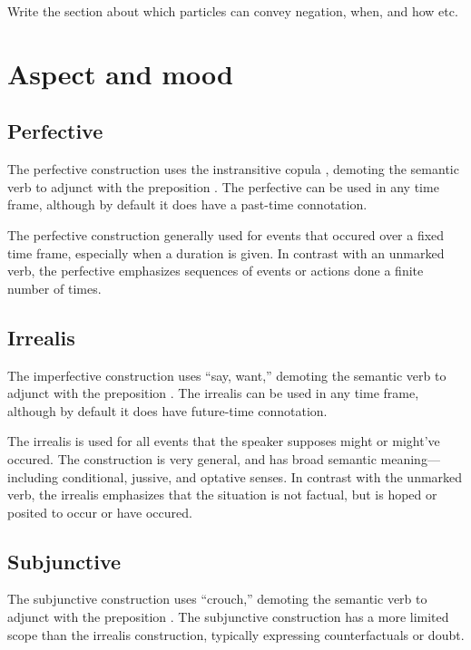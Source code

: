 \begin{kaobox}[frametitle=\sc todo:]
	Write the section about which particles can convey negation, when, and how etc.
\end{kaobox}

\section{Aspect and mood}
\subsection{Perfective}
The perfective construction uses the instransitive copula , demoting the semantic verb to adjunct with the preposition . The perfective can be used in any time frame, although by default it does have a past-time connotation.

The perfective construction generally used for events that occured over a fixed time frame, especially when a duration is given. In contrast with an unmarked verb, the perfective emphasizes sequences of events or actions done a finite number of times.

\subsection{Irrealis}
The imperfective construction uses  “say, want,” demoting the semantic verb to adjunct with the preposition . The irrealis can be used in any time frame, although by default it does have future-time connotation.

The irrealis is used for all events that the speaker supposes might or might've occured. The construction is very general, and has broad semantic meaning---including conditional, jussive, and optative senses. In contrast with the unmarked verb, the irrealis emphasizes that the situation is not factual, but is hoped or posited to occur or have occured.

\subsection{Subjunctive}
The subjunctive construction uses  “crouch,” demoting the semantic verb to adjunct with the preposition . The subjunctive construction has a more limited scope than the  irrealis construction, typically expressing counterfactuals or doubt.